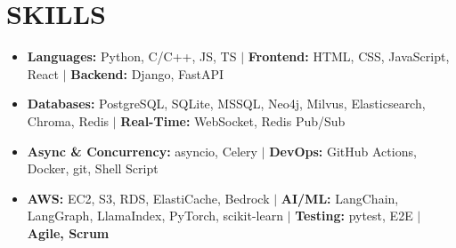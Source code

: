 \documentclass[letterpaper,11pt]{article}
\newcommand{\resumeItem}[1]{
  \item\small{#1}
}
\newcommand{\resumeItemListStart}{\begin{itemize}[label=$\vcenter{\hbox{\tiny$\bullet$}}$]}
\newcommand{\resumeItemListEnd}{\end{itemize}}
\begin{document}
\section{SKILLS}
\resumeItemListStart
\resumeItem{\textbf{Languages:} Python, C/C++, JS, TS $|$ \textbf{Frontend:} HTML, CSS, JavaScript, React $|$ \textbf{Backend:} Django, FastAPI}
\resumeItem{\textbf{Databases:} PostgreSQL, SQLite, MSSQL, Neo4j, Milvus, Elasticsearch, Chroma, Redis $|$ \textbf{Real-Time:} WebSocket, Redis Pub/Sub}
\resumeItem{\textbf{Async \& Concurrency:} asyncio, Celery $|$ \textbf{DevOps:} GitHub Actions, Docker, git, Shell Script}
\resumeItem{\textbf{AWS:} EC2, S3, RDS, ElastiCache, Bedrock $|$ \textbf{AI/ML:} LangChain, LangGraph, LlamaIndex, PyTorch, scikit-learn $|$ \textbf{Testing:} pytest, E2E $|$ \textbf{Agile, Scrum}}
\resumeItemListEnd
\vspace{-40pt}
\end{document}
